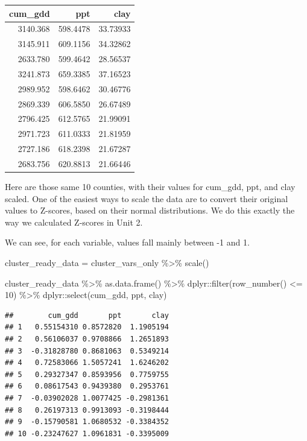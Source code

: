 \documentclass[
]{book}
\newenvironment{Shaded}{\begin{snugshade}}{\end{snugshade}}
\newcommand{\DecValTok}[1]{\textcolor[rgb]{0.00,0.00,0.81}{#1}}
\newcommand{\FunctionTok}[1]{\textcolor[rgb]{0.00,0.00,0.00}{#1}}
\newcommand{\NormalTok}[1]{#1}
\newcommand{\OtherTok}[1]{\textcolor[rgb]{0.56,0.35,0.01}{#1}}
\newcommand{\SpecialCharTok}[1]{\textcolor[rgb]{0.00,0.00,0.00}{#1}}
\begin{document}
\begin{tabular}[t]{r|r|r}
\hline
cum\_gdd & ppt & clay\\
\hline
3140.368 & 598.4478 & 33.73933\\
\hline
3145.911 & 609.1156 & 34.32862\\
\hline
2633.780 & 599.4642 & 28.56537\\
\hline
3241.873 & 659.3385 & 37.16523\\
\hline
2989.952 & 598.6462 & 30.46776\\
\hline
2869.339 & 606.5850 & 26.67489\\
\hline
2796.425 & 612.5765 & 21.99091\\
\hline
2971.723 & 611.0333 & 21.81959\\
\hline
2727.186 & 618.2398 & 21.67287\\
\hline
2683.756 & 620.8813 & 21.66446\\
\hline
\end{tabular}

Here are those same 10 counties, with their values for cum\_gdd, ppt, and clay scaled. One of the easiest ways to scale the data are to convert their original values to Z-scores, based on their normal distributions. We do this exactly the way we calculated Z-scores in Unit 2.

We can see, for each variable, values fall mainly between -1 and 1.

\begin{Shaded}
\begin{Highlighting}[]
\NormalTok{cluster\_ready\_data }\OtherTok{=}\NormalTok{ cluster\_vars\_only }\SpecialCharTok{\%\textgreater{}\%}
  \FunctionTok{scale}\NormalTok{()}

\NormalTok{cluster\_ready\_data }\SpecialCharTok{\%\textgreater{}\%}
  \FunctionTok{as.data.frame}\NormalTok{() }\SpecialCharTok{\%\textgreater{}\%}
\NormalTok{  dplyr}\SpecialCharTok{::}\FunctionTok{filter}\NormalTok{(}\FunctionTok{row\_number}\NormalTok{() }\SpecialCharTok{\textless{}=} \DecValTok{10}\NormalTok{) }\SpecialCharTok{\%\textgreater{}\%}
\NormalTok{  dplyr}\SpecialCharTok{::}\FunctionTok{select}\NormalTok{(cum\_gdd, ppt, clay)}
\end{Highlighting}
\end{Shaded}

\begin{verbatim}
##        cum_gdd       ppt       clay
## 1   0.55154310 0.8572820  1.1905194
## 2   0.56106037 0.9708866  1.2651893
## 3  -0.31828780 0.8681063  0.5349214
## 4   0.72583066 1.5057241  1.6246202
## 5   0.29327347 0.8593956  0.7759755
## 6   0.08617543 0.9439380  0.2953761
## 7  -0.03902028 1.0077425 -0.2981361
## 8   0.26197313 0.9913093 -0.3198444
## 9  -0.15790581 1.0680532 -0.3384352
## 10 -0.23247627 1.0961831 -0.3395009
\end{verbatim}
\end{document}

